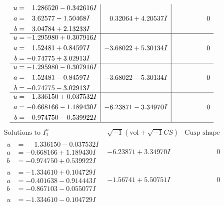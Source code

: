 \documentclass[1p]{elsarticle_modified}
\theoremstyle{definition}
\newcommand{\I}{\sqrt{-1}}
\begin{document}
$$\begin{array}{c|c|c}
\begin{aligned}
u &= \phantom{-}1.286520 - 0.342616 I \\
a &= \phantom{-}3.62577 - 1.50468 I \\
b &= \phantom{-}3.04784 + 2.13233 I\end{aligned}
 & \phantom{-}0.32064 + 4.20537 I & \phantom{-0.000000 } 0 \\ \hline\begin{aligned}
u &= -1.295980 + 0.307916 I \\
a &= \phantom{-}1.52481 + 0.84597 I \\
b &= -0.74775 + 3.02913 I\end{aligned}
 & -3.68022 + 5.30134 I & \phantom{-0.000000 } 0 \\ \hline\begin{aligned}
u &= -1.295980 - 0.307916 I \\
a &= \phantom{-}1.52481 - 0.84597 I \\
b &= -0.74775 - 3.02913 I\end{aligned}
 & -3.68022 - 5.30134 I & \phantom{-0.000000 } 0 \\ \hline\begin{aligned}
u &= \phantom{-}1.336150 + 0.037532 I \\
a &= -0.668166 - 1.189430 I \\
b &= -0.974750 - 0.539922 I\end{aligned}
 & -6.23871 - 3.34970 I & \phantom{-0.000000 } 0\\
 \hline 
 \end{array}$$\newpage$$\begin{array}{c|c|c}  
\text{Solutions to }I^u_{1}& \I (\text{vol} + \sqrt{-1}CS) & \text{Cusp shape}\\
 \hline 
\begin{aligned}
u &= \phantom{-}1.336150 - 0.037532 I \\
a &= -0.668166 + 1.189430 I \\
b &= -0.974750 + 0.539922 I\end{aligned}
 & -6.23871 + 3.34970 I & \phantom{-0.000000 } 0 \\ \hline\begin{aligned}
u &= -1.334610 + 0.104729 I \\
a &= -0.401638 - 0.914443 I \\
b &= -0.867103 - 0.055077 I\end{aligned}
 & -1.56741 + 5.50751 I & \phantom{-0.000000 } 0 \\ \hline\begin{aligned}
u &= -1.334610 - 0.104729 I \\

\end{aligned}
\end{array}$$
\end{document}
